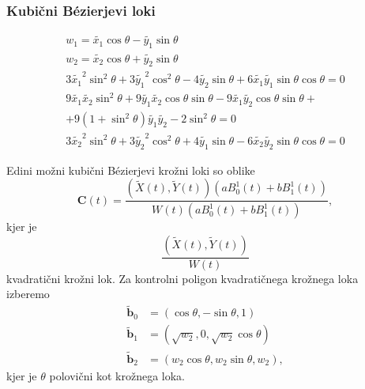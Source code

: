 \documentclass[a4paper, 12pt]{beamer}
\theoremstyle{definition}
\theoremstyle{plain}
\begin{document}
\begin{frame}
    \frametitle{Kubični B\'ezierjevi loki}
    \begin{align*}
        w_1 = \tilde{x_1}\cos{\theta} - \tilde{y_1} \sin{\theta}   \\
        w_2 = \tilde{x_2}\cos{\theta} + \tilde{y_2} \sin{\theta}   \\
        3\tilde{x_1}^2\sin^2{\theta} + 3\tilde{y_1}^2\cos^2{\theta} - 4\tilde{y_2} \sin{\theta}  + 6\tilde{x_1}\tilde{y_1} \sin{\theta} \cos{\theta} = 0 \\
        9\tilde{x_1}\tilde{x_2}\sin^2{\theta} + 9\tilde{y_1}\tilde{x_2}\cos{\theta} \sin{\theta} - 9\tilde{x_1} \tilde{y_2} \cos{\theta} \sin{\theta}+ \\
        + 9 (1 + \sin^2{\theta}) \tilde{y_1} \tilde{y_2} - 2\sin^2{\theta} = 0 \\
        3\tilde{x_2}^2 \sin^2{\theta}+ 3\tilde{y_2}^2 \cos^2{\theta}+ 4\tilde{y_1} \sin{\theta}  - 6\tilde{x_2}\tilde{y_2}\sin{\theta} \cos{\theta}  = 0 
    \end{align*}
        

\end{frame}


\begin{frame}
    Edini možni kubični B\'ezierjevi krožni loki so oblike
    $$\boldsymbol{C}(t)=\frac{(\tilde{X}(t),\tilde{Y}(t))(aB_0^1(t)+bB_1^1(t))}{W(t)(aB_0^1(t)+bB_1^1(t))},$$
    kjer je $$\frac{(\tilde{X}(t),\tilde{Y}(t))}{W(t)}$$
    kvadratični krožni lok.
    Za kontrolni poligon kvadratičnega krožnega loka izberemo
    \begin{align*}
    \boldsymbol{\tilde{b}}_0 &= (\cos{\theta}, -\sin{\theta}, 1)\\
    \boldsymbol{\tilde{b}}_1 &= (\sqrt{w_2}, 0,\sqrt{w_2} \cos{\theta})\\
    \boldsymbol{\tilde{b}}_2 &= (w_2\cos \theta, w_2 \sin\theta, w_2),
    \end{align*}
    kjer je $\theta$ polovični kot krožnega loka. 

\end{frame}

\end{document}
